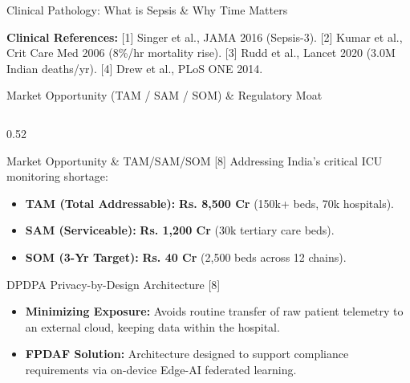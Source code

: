 \documentclass[aspectratio=169, 11pt]{beamer}
\begin{document}
\begin{frame}{Clinical Pathology: What is Sepsis \& Why Time Matters}
    \vspace{0.01cm}
    \begin{block}{}
        \tiny \textcolor{neonCyan}{\textbf{Clinical References:}} \textcolor{mutedText}{[1] Singer et al., JAMA 2016 (Sepsis-3). [2] Kumar et al., Crit Care Med 2006 (8\%/hr mortality rise). [3] Rudd et al., Lancet 2020 (3.0M Indian deaths/yr). [4] Drew et al., PLoS ONE 2014.}
    \end{block}
\end{frame}

\begin{frame}{Market Opportunity (TAM / SAM / SOM) \& Regulatory Moat}
    \begin{columns}[c]
        \begin{column}{0.52\textwidth}
            \begin{block}{\textcolor{neonCyan}{Market Opportunity \& TAM/SAM/SOM [8]}}
                \tiny
                Addressing India's critical ICU monitoring shortage:
                \begin{itemize}
                    \item \textbf{TAM (Total Addressable):} \textbf{Rs. 8,500 Cr} (150k+ beds, 70k hospitals).
                    \item \textbf{SAM (Serviceable):} \textbf{Rs. 1,200 Cr} (30k tertiary care beds).
                    \item \textbf{SOM (3-Yr Target):} \textbf{Rs. 40 Cr} (2,500 beds across 12 chains).
                \end{itemize}
            \end{block}

            \begin{block}{\textcolor{neonAmber}{DPDPA Privacy-by-Design Architecture [8]}}
                \tiny
                \begin{itemize}
                    \item \textbf{Minimizing Exposure:} Avoids routine transfer of raw patient telemetry to an external cloud, keeping data within the hospital.
                    \item \textbf{FPDAF Solution:} Architecture designed to support compliance requirements via on-device Edge-AI federated learning.
                \end{itemize}
            \end{block}
        \end{column}
        

\end{columns}
\end{frame}
\end{document}
